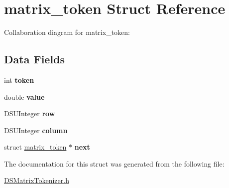 \hypertarget{structmatrix__token}{
\section{matrix\_\-token Struct Reference}
\label{structmatrix__token}
}


Collaboration diagram for matrix\_\-token:\subsection*{Data Fields}
\begin{DoxyCompactItemize}
\item 
\hypertarget{structmatrix__token_a8abb7e972adc09624edab301e021dc5f}{
int {\bfseries token}}
\label{structmatrix__token_a8abb7e972adc09624edab301e021dc5f}

\item 
\hypertarget{structmatrix__token_aee90379adb0307effb138f4871edbc5c}{
double {\bfseries value}}
\label{structmatrix__token_aee90379adb0307effb138f4871edbc5c}

\item 
\hypertarget{structmatrix__token_a00401bf65b400ffdf3b86fb5ee3d9dbf}{
DSUInteger {\bfseries row}}
\label{structmatrix__token_a00401bf65b400ffdf3b86fb5ee3d9dbf}

\item 
\hypertarget{structmatrix__token_a4c64098eedd35cc3518705475a7e3971}{
DSUInteger {\bfseries column}}
\label{structmatrix__token_a4c64098eedd35cc3518705475a7e3971}

\item 
\hypertarget{structmatrix__token_ab0ae7cd03008dcc07ae97156b67d2e72}{
struct \hyperlink{structmatrix__token}{matrix\_\-token} $\ast$ {\bfseries next}}
\label{structmatrix__token_ab0ae7cd03008dcc07ae97156b67d2e72}

\end{DoxyCompactItemize}


The documentation for this struct was generated from the following file:\begin{DoxyCompactItemize}
\item 
\hyperlink{_d_s_matrix_tokenizer_8h}{DSMatrixTokenizer.h}\end{DoxyCompactItemize}
